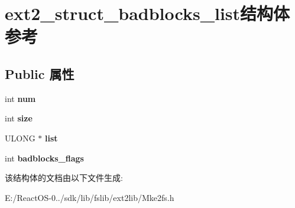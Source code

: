 \hypertarget{structext2__struct__badblocks__list}{}\section{ext2\+\_\+struct\+\_\+badblocks\+\_\+list结构体 参考}
\label{structext2__struct__badblocks__list}
\subsection*{Public 属性}
\begin{DoxyCompactItemize}
\item 
\mbox{\label{structext2__struct__badblocks__list_a9c26586e93b3ed872a1a06a9ae001b2d}} 
int {\bfseries num}
\item 
\mbox{\label{structext2__struct__badblocks__list_ac9a86f5699e94838053b4451bd18b371}} 
int {\bfseries size}
\item 
\mbox{\label{structext2__struct__badblocks__list_a392263824271f9ef34a4ed2c6ba2a65b}} 
U\+L\+O\+NG $\ast$ {\bfseries list}
\item 
\mbox{\label{structext2__struct__badblocks__list_a1c04a7ae7f7e6ea1699cfd13fc628742}} 
int {\bfseries badblocks\+\_\+flags}
\end{DoxyCompactItemize}


该结构体的文档由以下文件生成\+:\begin{DoxyCompactItemize}
\item 
E\+:/\+React\+O\+S-\/0../sdk/lib/fslib/ext2lib/Mke2fs.\+h\end{DoxyCompactItemize}
